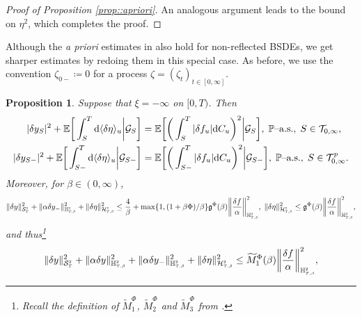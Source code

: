 \documentclass[10pt]{article} %
\newtheorem{proposition}[theorem]{Proposition}
\newcommand\cG{\mathcal G}
\newcommand\cH{\mathcal H}
\newcommand\cS{\mathcal S}
\newcommand\cT{\mathcal T}
\newcommand{\smalltext}[1]{\text{\fontsize{4}{4}\selectfont$#1$}}
\newcommand\fg{\mathfrak g}
\def \E{\mathbb{E}}
\def \H{\mathbb{H}}
\def \P{\mathbb{P}}
\def\d{\mathrm{d}}
\begin{document}
\begin{proof}[Proof of Proposition \ref{prop::apriori}]
	
	
	
	An analogous argument leads to the bound on $\eta^2$, which completes the proof.
\end{proof}

Although the \emph{a priori} estimates in  also hold for non-reflected BSDEs, we get sharper estimates by redoing them in this special case. As before, we use the convention $\zeta_{0-} \coloneqq 0$ for a process $\zeta =(\zeta_t)_{t \in [0,\infty]}$.

\begin{proposition}\label{prop::apriori_bsde}
	Suppose that $\xi = -\infty$ on $[0,T)$. Then
	\begin{align*}
		|\delta y_S|^2 +\E\bigg[\int_S^T \d \langle\delta\eta\rangle_u \bigg| \cG_S\bigg] &= \E\bigg[\bigg(\int_S^T |\delta f_u| \d C_u\bigg)^2\bigg| \cG_S\bigg], \; \text{$\P$\rm--a.s.}, \; S \in \cT_{0,\infty},\\
		|\delta y_{S-}|^2 +\E\bigg[\int_{S-}^T \d \langle\delta\eta\rangle_u \bigg| \cG_{S-}\bigg] &= \E\bigg[\bigg(\int_{S-}^T |\delta f_u| \d C_u\bigg)^2\bigg| \cG_{S-}\bigg], \; \text{$\P$\rm--a.s.}, \; S \in \cT^p_{0,\infty}.
	\end{align*}
	Moreover, for $\beta \in (0,\infty)$,
	\begin{equation*}
		\|\delta y\|^2_{\cS^\smalltext{2}_\smalltext{T}} + \|\alpha\delta y_{-}\|^2_{\H^\smalltext{2}_{\smalltext{T}\smalltext{,}\smalltext{\beta}}} + \|\delta\eta\|^2_{\cH^\smalltext{2}_{\smalltext{T}\smalltext{,}\smalltext{\beta}}} 
		\leq \frac{4}{\beta} + \max\{1,(1+\beta\Phi)/\beta\}\fg^\Phi(\beta) \bigg\|\frac{\delta f}{\alpha}\bigg\|^2_{\H^\smalltext{2}_{\smalltext{T}\smalltext{,}\smalltext{\beta}}},\;
		\|\delta\eta\|^2_{\cH^\smalltext{2}_{\smalltext{T}\smalltext{,}\smalltext{\beta}}} 
		\leq\fg^\Phi(\beta) \bigg\|\frac{\delta f}{\alpha}\bigg\|^2_{\H^\smalltext{2}_{\smalltext{T}\smalltext{,}\smalltext{\beta}}},
	\end{equation*}
	and thus\footnote{Recall the definition of $\widetilde M^\Phi_1$, $\widetilde M^\Phi_2$ and $\widetilde M^\Phi_3$ from .}
	\begin{equation*}
		\|\delta y\|^2_{\cS^\smalltext{2}_\smalltext{T}} + \|\alpha\delta y\|^2_{\H^\smalltext{2}_{\smalltext{T}\smalltext{,}\smalltext{\beta}}} + \|\alpha\delta y_{-}\|^2_{\H^\smalltext{2}_{\smalltext{T}\smalltext{,}\smalltext{\beta}}} + \|\delta\eta\|^2_{\cH^\smalltext{2}_{\smalltext{T}\smalltext{,}\smalltext{\beta}}} 
		\leq \widetilde M^\Phi_1(\beta) \bigg\|\frac{\delta f}{\alpha}\bigg\|^2_{\H^\smalltext{2}_{\smalltext{T}\smalltext{,}\smalltext{\beta}}},

\end{equation*}
\end{proposition}
\end{document}
